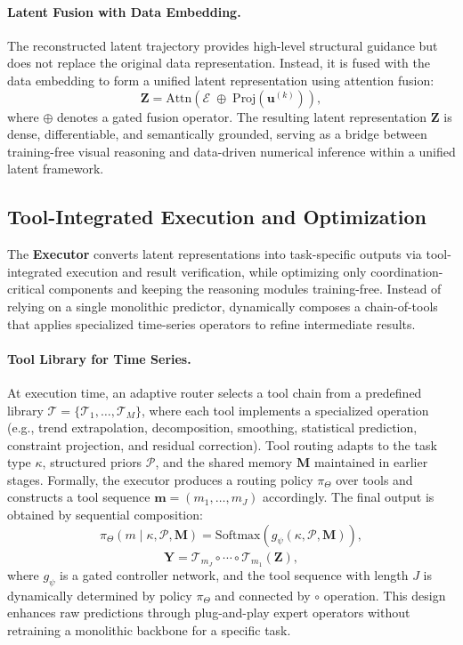 \paragraph{Latent Fusion with Data Embedding.}
The reconstructed latent trajectory provides high-level structural guidance but does not replace the original data representation.
Instead, it is fused with the data embedding to form a unified latent representation using attention fusion:
\begin{equation}
\mathbf{Z} = \text{Attn}(\mathcal{E} \;\oplus\; \text{Proj}\!\left( \mathbf{u}^{(k)} \right)),
\end{equation}
where $\oplus$ denotes a gated fusion operator.
The resulting latent representation $\mathbf{Z}$ is dense, differentiable, and semantically grounded, serving as a bridge between training-free visual reasoning and data-driven numerical inference within a unified latent framework.

\subsection{Tool-Integrated Execution and Optimization}
\label{sec:execution_optimization}
The \textbf{Executor} converts latent representations into task-specific outputs via tool-integrated execution and result verification, while optimizing only coordination-critical components and keeping the reasoning modules training-free.
Instead of relying on a single monolithic predictor, \model dynamically composes a chain-of-tools that applies specialized time-series operators to refine intermediate results.

\paragraph{Tool Library for Time Series.}
At execution time, an adaptive router selects a tool chain from a predefined library $\mathcal{T}=\{\mathcal{T}_1,\dots,\mathcal{T}_M\}$, where each tool implements a specialized operation (e.g., trend extrapolation, decomposition, smoothing, statistical prediction, constraint projection, and residual correction).
Tool routing adapts to the task type $\kappa$, structured priors $\mathcal{P}$, and the shared memory $\mathbf{M}$ maintained in earlier stages. 
Formally, the executor produces a routing policy $\pi_{\Theta}$ over tools and constructs a tool sequence $\mathbf{m}=(m_1,\dots,m_J)$ accordingly. The final output is obtained by sequential composition:
\begin{equation}
\pi_{\Theta}(m \mid \kappa, \mathcal{P}, \mathbf{M})
= \mathrm{Softmax}\!\left(g_{\psi}(\kappa, \mathcal{P}, \mathbf{M})\right),
\end{equation}
\begin{equation}
\hat{\mathbf{Y}}
= \mathcal{T}_{m_J} \circ \cdots \circ \mathcal{T}_{m_1}(\mathbf{Z}),
\end{equation}
where $g_{\psi}$ is a gated controller network, and the tool sequence with length $J$ is dynamically determined by policy $\pi_{\Theta}$ and connected by $\circ$ operation.
This design enhances raw predictions through plug-and-play expert operators without retraining a monolithic backbone for a specific task.

